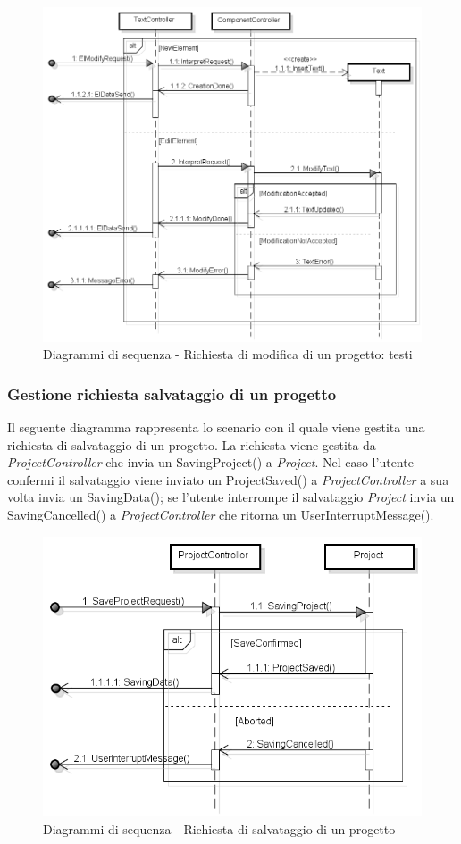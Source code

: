 \begin{figure}[H]
	\centering
	\includegraphics[scale=0.5]{img/text.png}
	\caption{Diagrammi di sequenza - Richiesta di modifica di un progetto: testi}
\end{figure}

\subsubsection{Gestione richiesta salvataggio di un progetto}
Il seguente diagramma rappresenta lo scenario con il quale viene gestita una richiesta di salvataggio di un progetto. La richiesta viene gestita da \textit{ProjectController} che invia un SavingProject() a \textit{Project}. Nel caso l'utente confermi il salvataggio viene inviato un ProjectSaved() a \textit{ProjectController} a sua volta invia un SavingData(); se l'utente interrompe il salvataggio \textit{Project} invia un SavingCancelled() a \textit{ProjectController} che ritorna un UserInterruptMessage().

\begin{figure}[H]
	\centering
	\includegraphics[scale=0.5]{img/save.png}
	\caption{Diagrammi di sequenza - Richiesta di salvataggio di un progetto}
\end{figure}
\newpage